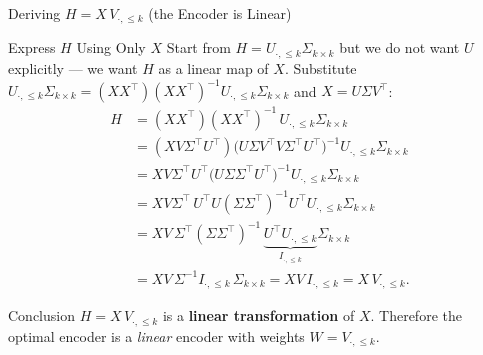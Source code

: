 \documentclass{beamer}
\begin{document}
\begin{frame}[shrink=10]{Deriving $H = X\,V_{\cdot,\le k}$ (the Encoder is Linear)}
  \begin{block}{Express $H$ Using Only $X$}
    Start from $H = U_{\cdot,\le k}\Sigma_{k\times k}$ but we do not want
    $U$ explicitly --- we want $H$ as a linear map of $X$. Substitute
    $U_{\cdot,\le k}\Sigma_{k\times k}
       = (XX^{\top})(XX^{\top})^{-1}U_{\cdot,\le k}\Sigma_{k\times k}$
    and $X = U\Sigma V^{\top}$:
    \begin{align*}
      H &= (XX^{\top})(XX^{\top})^{-1}\,U_{\cdot,\le k}\Sigma_{k\times k}\\
        &= (XV\Sigma^{\top}U^{\top})\bigl(U\Sigma V^{\top}V\Sigma^{\top}U^{\top}\bigr)^{-1}
            U_{\cdot,\le k}\Sigma_{k\times k}\\
        &= XV\Sigma^{\top}U^{\top}
            \bigl(U\Sigma\Sigma^{\top}U^{\top}\bigr)^{-1}
            U_{\cdot,\le k}\Sigma_{k\times k}\\
        &= XV\Sigma^{\top}\,U^{\top}U
            (\Sigma\Sigma^{\top})^{-1}U^{\top}
            U_{\cdot,\le k}\Sigma_{k\times k}\\
        &= XV\,\Sigma^{\top}(\Sigma\Sigma^{\top})^{-1}\,
            \underbrace{U^{\top}U_{\cdot,\le k}}_{I_{\cdot,\le k}}\Sigma_{k\times k}\\
        &= XV\,\Sigma^{-1}I_{\cdot,\le k}\,\Sigma_{k\times k}
         = XV\,I_{\cdot,\le k}
         = X\,V_{\cdot,\le k}.
    \end{align*}
  \end{block}

  \begin{exampleblock}{Conclusion}
    $H = X\,V_{\cdot,\le k}$ is a \textbf{linear transformation} of $X$.
    Therefore the optimal encoder is a \emph{linear} encoder with weights
    $W = V_{\cdot,\le k}$.
  \end{exampleblock}
\end{frame}
\end{document}
